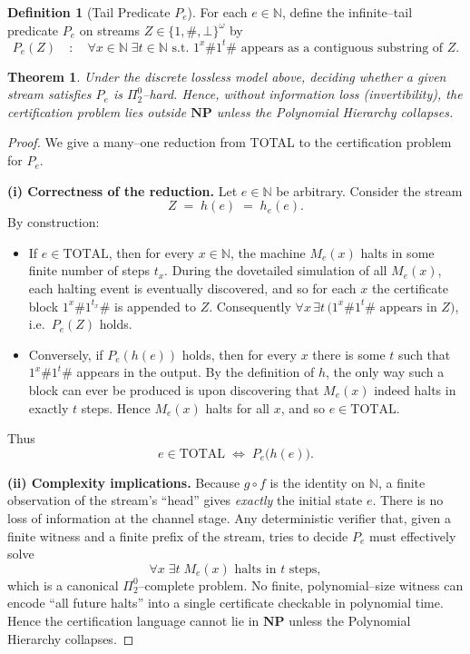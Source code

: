 \documentclass[12pt]{article}
\theoremstyle{definition}
\newtheorem*{definition}{Definition}
\theoremstyle{plain}
\newtheorem*{theorem}{Theorem}
\begin{document}
\begin{definition}[Tail Predicate \(P_e\)]
For each $e\in\mathbb N$, define the infinite–tail predicate $P_e$ on streams $Z\in\{1,\#,\bot\}^\omega$ by
\[
  P_e(Z)\quad:\quad
  \forall x\in\mathbb N\;\exists t\in\mathbb N\text{ s.t.\ }1^x\#1^t\#\text{ appears as a contiguous substring of }Z.
\]
\end{definition}

\begin{theorem}
Under the discrete lossless model above, deciding whether a given stream satisfies $P_e$ is $\Pi^0_2$–hard.  Hence, without information loss (invertibility), the certification problem lies outside $\mathbf{NP}$ unless the Polynomial Hierarchy collapses.
\end{theorem}

\begin{proof}
We give a many–one reduction from \textsc{TOTAL} to the certification problem for $P_e$.

\medskip\noindent\textbf{(i) Correctness of the reduction.}
Let $e\in\mathbb N$ be arbitrary.  Consider the stream
\[
  Z \;=\; h(e)\;=\;h_e(e).
\]
By construction:

\begin{itemize}
  \item[$\Rightarrow$] If $e\in\mathrm{TOTAL}$, then for every $x\in\mathbb N$, the machine $M_e(x)$ halts in some finite number of steps $t_x$.  During the dovetailed simulation of all $M_e(x)$, each halting event is eventually discovered, and so for each $x$ the certificate block $1^x\#1^{t_x}\#$ is appended to $Z$.  Consequently $\forall x\,\exists t\,\bigl(1^x\#1^t\#\text{ appears in }Z\bigr)$, i.e.\ $P_e(Z)$ holds.

  \item[$\Leftarrow$] Conversely, if $P_e(h(e))$ holds, then for every $x$ there is some $t$ such that $1^x\#1^t\#$ appears in the output.  By the definition of $h$, the only way such a block can ever be produced is upon discovering that $M_e(x)$ indeed halts in exactly $t$ steps.  Hence $M_e(x)$ halts for all $x$, and so $e\in\mathrm{TOTAL}$.
\end{itemize}

Thus
\[
e\in\mathrm{TOTAL}
\;\Longleftrightarrow\;
P_e\bigl(h(e)\bigr).
\]

\medskip\noindent\textbf{(ii) Complexity implications.}
Because $g\circ f$ is the identity on $\mathbb N$, a finite observation of the stream’s “head” gives \emph{exactly} the initial state $e$.  There is no loss of information at the channel stage.  Any deterministic verifier that, given a finite witness and a finite prefix of the stream, tries to decide $P_e$ must effectively solve
\[
  \forall x\;\exists t\;M_e(x)\text{ halts in }t\text{ steps},
\]
which is a canonical $\Pi^0_2$–complete problem.  No finite, polynomial–size witness can encode “all future halts” into a single certificate checkable in polynomial time.  Hence the certification language cannot lie in $\mathbf{NP}$ unless the Polynomial Hierarchy collapses.

\end{proof}
\end{document}
